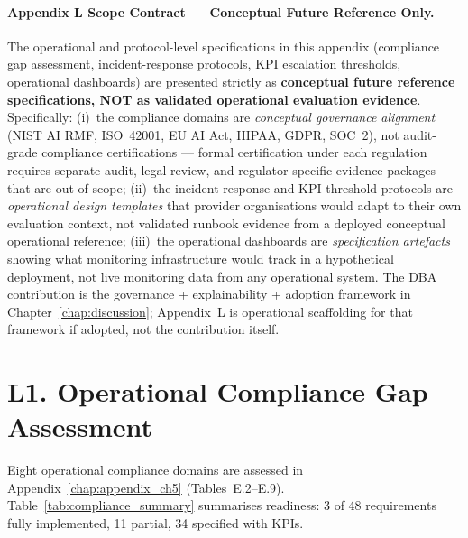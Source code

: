 \paragraph{Appendix L Scope Contract --- Conceptual Future Reference Only.}
\label{para:appendix_l_scope_contract}
The operational and protocol-level specifications in this appendix (compliance gap assessment, incident-response protocols, KPI escalation thresholds, operational dashboards) are presented strictly as \textbf{conceptual future reference specifications, NOT as validated operational evaluation evidence}. Specifically: (i)~the compliance domains are \emph{conceptual governance alignment} (NIST AI RMF, ISO~42001, EU AI Act, HIPAA, GDPR, SOC~2), not audit-grade compliance certifications --- formal certification under each regulation requires separate audit, legal review, and regulator-specific evidence packages that are out of scope; (ii)~the incident-response and KPI-threshold protocols are \emph{operational design templates} that provider organisations would adapt to their own evaluation context, not validated runbook evidence from a deployed conceptual operational reference; (iii)~the operational dashboards are \emph{specification artefacts} showing what monitoring infrastructure would track in a hypothetical deployment, not live monitoring data from any operational system. The DBA contribution is the governance + explainability + adoption framework in Chapter~\ref{chap:discussion}; Appendix~L is operational scaffolding for that framework if adopted, not the contribution itself.


\section*{L1. Operational Compliance Gap Assessment}
\label{sec:appl_compliance}

Eight operational compliance domains are assessed in Appendix~\ref{chap:appendix_ch5} (Tables~E.2--E.9). Table~\ref{tab:compliance_summary} summarises readiness: 3 of 48 requirements fully implemented, 11 partial, 34 specified with KPIs.

